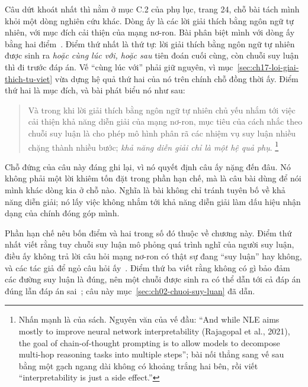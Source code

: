 %
Câu dứt khoát nhất thì nằm ở mục C.2 của phụ lục, trang 24, chỗ bài tách mình
khỏi một dòng nghiên cứu khác. Dòng ấy là các lời giải thích bằng ngôn ngữ tự
nhiên, với mục đích cải thiện
 của mạng nơ-ron. Bài phân biệt mình với
dòng ấy bằng hai điểm~\autocite{p06cot}. Điểm thứ nhất là thứ tự: lời giải thích
bằng ngôn ngữ tự nhiên được sinh ra \emph{hoặc cùng lúc với, hoặc sau} tiên đoán
cuối cùng, còn chuỗi suy luận thì đi trước đáp án. Vế \enquote{cùng lúc với} phải
giữ nguyên, vì mục~\ref{sec:ch17-loi-giai-thich-tu-viet} vừa dựng hệ quả thứ hai
của nó trên chính chỗ đồng thời ấy. Điểm thứ hai là mục đích, và bài phát biểu nó
như sau:

\begin{quote}
Và trong khi lời giải thích bằng ngôn ngữ tự nhiên chủ yếu nhắm tới việc cải
thiện khả năng diễn giải của mạng nơ-ron, mục tiêu của cách nhắc theo chuỗi suy
luận là cho phép mô hình phân rã các nhiệm vụ suy luận nhiều chặng thành nhiều
bước; \emph{khả năng diễn giải chỉ là một hệ quả phụ}.%
\footnote{Nhấn mạnh là của sách. Nguyên văn của vế đầu: \enquote{And while NLE
aims mostly to improve neural network interpretability (Rajagopal et al., 2021),
the goal of chain-of-thought prompting is to allow models to decompose multi-hop
reasoning tasks into multiple steps}; bài nối thẳng sang vế sau bằng một gạch
ngang dài không có khoảng trắng hai bên, rồi viết
\enquote{interpretability is just a side effect.}}
\end{quote}

Chỗ đứng của câu này đáng ghi lại, vì nó quyết định câu ấy nặng đến đâu. Nó không
phải một lời khiêm tốn đặt trong phần hạn chế, mà là câu bài dùng để nói mình
khác dòng kia ở chỗ nào. Nghĩa là bài không chỉ tránh tuyên bố về khả năng diễn
giải; nó lấy việc không nhắm tới khả năng diễn giải làm dấu hiệu nhận dạng của
chính đóng góp mình.

%
Phần hạn chế nêu bốn điểm và hai trong số đó thuộc về chương này. Điểm thứ nhất
viết rằng tuy chuỗi suy luận mô phỏng quá trình nghĩ của người suy luận, điều ấy
không trả lời câu hỏi mạng nơ-ron có thật sự đang \enquote{suy luận} hay không,
và các tác giả để ngỏ câu hỏi ấy~\autocite{p06cot}. Điểm thứ ba viết rằng không
có gì bảo đảm các đường suy luận là đúng, nên một chuỗi được sinh ra có thể dẫn
tới cả đáp án đúng lẫn đáp án sai~\autocite{p06cot}; câu này
mục~\ref{sec:ch02-chuoi-suy-luan} đã dẫn.

